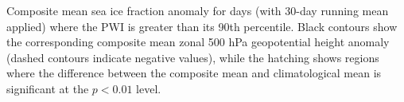 \label{fig:sic_composite}
Composite mean sea ice fraction anomaly for days (with 30-day running mean applied) where the PWI is greater than its 90th percentile. Black contours show the corresponding composite mean zonal 500 hPa geopotential height anomaly (dashed contours indicate negative values), while the hatching shows regions where the difference between the composite mean and climatological mean is significant at the $p < 0.01$ level.